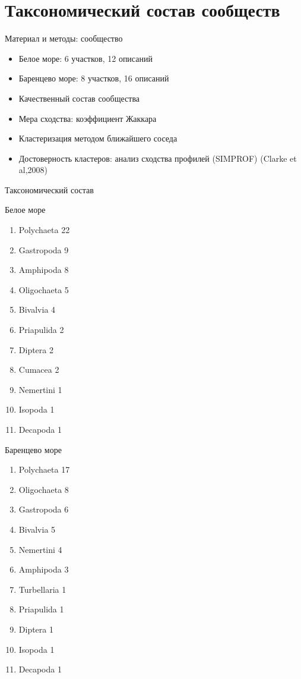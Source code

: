 \documentclass{beamer}
\begin{document}
		\section[Сообщество]{Таксономический состав сообществ}
\begin{frame}{Материал и методы: сообщество}
 \begin{itemize}
	\item Белое море: 6 участков, 12 описаний
	\item Баренцево море: 8 участков, 16 описаний
	\item Качественный состав сообщества
	\item Мера сходства: коэффициент Жаккара
	\item Кластеризация методом ближайшего соседа
	\item Достоверность кластеров: анализ сходства профилей (SIMPROF) (Clarke et al,2008)
 \end{itemize}
\end{frame}

\begin{frame}{Таксономический состав}
	\begin{minipage}[b]{.49\linewidth}
		Белое море
		\begin{enumerate}
			\item Polychaeta 22
			\item Gastropoda 9
			\item Amphipoda 8
			\item Oligochaeta 5
			\item Bivalvia 4
			\item Priapulida 2
			\item Diptera 2
			\item Cumacea 2
			\item Nemertini 1
			\item Isopoda 1
			\item Decapoda 1
		\end{enumerate}
	\end{minipage}
%
	\begin{minipage}[b]{.49\linewidth}
		Баренцево море
		\begin{enumerate}
			\item Polychaeta 17
			\item Oligochaeta 8
			\item Gastropoda 6
			\item Bivalvia 5
			\item Nemertini 4
			\item Amphipoda 3
			\item Turbellaria 1
			\item Priapulida 1
			\item Diptera 1
			\item Isopoda 1
			\item Decapoda 1
		\end{enumerate}
	\end{minipage}
\end{frame}
\end{document}
